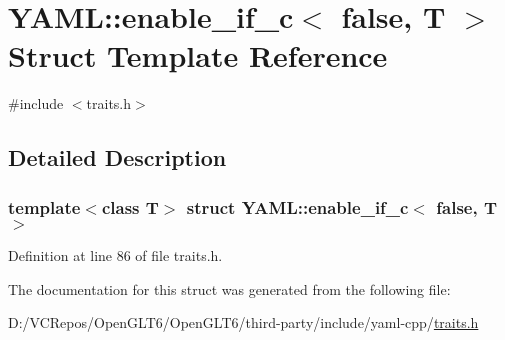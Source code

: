 \hypertarget{struct_y_a_m_l_1_1enable__if__c_3_01false_00_01_t_01_4}{}\section{Y\+A\+ML\+::enable\+\_\+if\+\_\+c$<$ false, T $>$ Struct Template Reference}
\label{struct_y_a_m_l_1_1enable__if__c_3_01false_00_01_t_01_4}


{\ttfamily \#include $<$traits.\+h$>$}



\subsection{Detailed Description}
\subsubsection*{template$<$class T$>$\newline
struct Y\+A\+M\+L\+::enable\+\_\+if\+\_\+c$<$ false, T $>$}



Definition at line 86 of file traits.\+h.



The documentation for this struct was generated from the following file\+:\begin{DoxyCompactItemize}
\item 
D\+:/\+V\+C\+Repos/\+Open\+G\+L\+T6/\+Open\+G\+L\+T6/third-\/party/include/yaml-\/cpp/\mbox{\hyperlink{traits_8h}{traits.\+h}}\end{DoxyCompactItemize}
